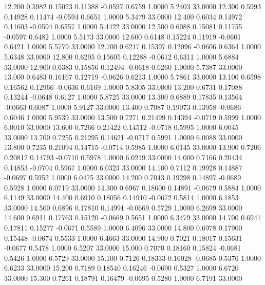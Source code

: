   12.200   0.5982   0.15023   0.11388  -0.0597   0.6759   1.0000   5.2403  33.0000
  12.300   0.5993   0.14928   0.11474  -0.0594   0.6651   1.0000   5.3479  33.0000
  12.400   0.6034   0.14972   0.11603  -0.0594   0.6557   1.0000   5.4422  33.0000
  12.500   0.6088   0.15081   0.11755  -0.0597   0.6482   1.0000   5.5173  33.0000
  12.600   0.6148   0.15224   0.11919  -0.0601   0.6421   1.0000   5.5779  33.0000
  12.700   0.6217   0.15397   0.12096  -0.0606   0.6364   1.0000   5.6348  33.0000
  12.800   0.6295   0.15605   0.12288  -0.0612   0.6311   1.0000   5.6884  33.0000
  12.900   0.6383   0.15856   0.12494  -0.0618   0.6260   1.0000   5.7387  33.0000
  13.000   0.6483   0.16167   0.12719  -0.0626   0.6213   1.0000   5.7861  33.0000
  13.100   0.6598   0.16562   0.12966  -0.0636   0.6169   1.0000   5.8305  33.0000
  13.200   0.6731   0.17088   0.13244  -0.0648   0.6127   1.0000   5.8725  33.0000
  13.300   0.6889   0.17835   0.13564  -0.0663   0.6087   1.0000   5.9127  33.0000
  13.400   0.7087   0.19073   0.13958  -0.0686   0.6046   1.0000   5.9539  33.0000
  13.500   0.7271   0.21499   0.14394  -0.0719   0.5999   1.0000   6.0010  33.0000
  13.600   0.7266   0.21422   0.14512  -0.0718   0.5995   1.0000   6.0045  33.0000
  13.700   0.7255   0.21295   0.14621  -0.0717   0.5991   1.0000   6.0088  33.0000
  13.800   0.7235   0.21094   0.14715  -0.0714   0.5985   1.0000   6.0145  33.0000
  13.900   0.7206   0.20812   0.14793  -0.0710   0.5978   1.0000   6.0219  33.0000
  14.000   0.7166   0.20434   0.14853  -0.0704   0.5967   1.0000   6.0323  33.0000
  14.100   0.7112   0.19928   0.14887  -0.0697   0.5952   1.0000   6.0475  33.0000
  14.200   0.7043   0.19298   0.14897  -0.0689   0.5928   1.0000   6.0719  33.0000
  14.300   0.6967   0.18600   0.14891  -0.0679   0.5884   1.0000   6.1149  33.0000
  14.400   0.6910   0.18056   0.14910  -0.0672   0.5814   1.0000   6.1853  33.0000
  14.500   0.6896   0.17810   0.14991  -0.0669   0.5729   1.0000   6.2699  33.0000
  14.600   0.6911   0.17763   0.15120  -0.0669   0.5651   1.0000   6.3479  33.0000
  14.700   0.6941   0.17811   0.15277  -0.0671   0.5589   1.0000   6.4096  33.0000
  14.800   0.6978   0.17900   0.15448  -0.0674   0.5533   1.0000   6.4663  33.0000
  14.900   0.7021   0.18017   0.15631  -0.0677   0.5478   1.0000   6.5207  33.0000
  15.000   0.7070   0.18160   0.15824  -0.0681   0.5426   1.0000   6.5729  33.0000
  15.100   0.7126   0.18333   0.16028  -0.0685   0.5376   1.0000   6.6233  33.0000
  15.200   0.7189   0.18540   0.16246  -0.0690   0.5327   1.0000   6.6720  33.0000
  15.300   0.7261   0.18791   0.16479  -0.0695   0.5280   1.0000   6.7191  33.0000
